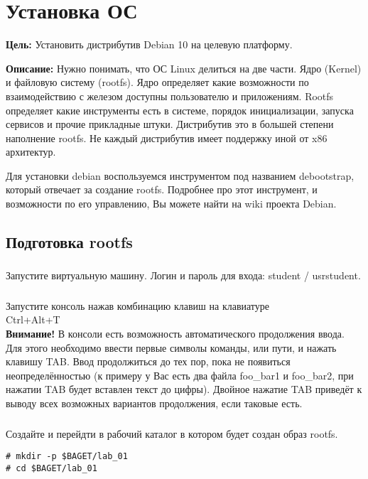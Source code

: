 \chapter{Установка ОС}
\textbf{Цель:} Установить дистрибутив Debian 10 на целевую платформу.

\textbf{Описание:} Нужно понимать, что ОС Linux делиться на две части. Ядро (Kernel) и файловую систему (rootfs). Ядро определяет какие возможности по взаимодействию с железом доступны пользователю и приложениям. Rootfs определяет какие инструменты есть в системе, порядок инициализации, запуска сервисов и прочие прикладные штуки. Дистрибутив это в большей степени наполнение rootfs. Не каждый дистрибутив имеет поддержку иной от x86 архитектур.

Для установки debian воспользуемся инструментом под названием debootstrap, который отвечает за создание rootfs. Подробнее про этот инструмент, и возможности по его управлению, Вы можете найти на wiki проекта Debian.


\section{Подготовка rootfs}

\subsection{}Запустите виртуальную машину. Логин и пароль для входа: student / usrstudent.

\subsection{} Запустите консоль нажав комбинацию клавиш на клавиатуре \\Ctrl+Alt+T\\

\textbf{Внимание!} В консоли есть возможность автоматического продолжения ввода. Для этого необходимо ввести первые символы команды, или пути, и нажать клавишу TAB. Ввод продолжиться до тех пор, пока не появиться неопределённостью (к примеру у Вас есть два файла foo\_bar1 и foo\_bar2, при нажатии TAB будет вставлен текст до цифры). Двойное нажатие TAB приведёт к выводу всех возможных вариантов продолжения, если таковые есть.

\subsection{}Создайте и перейдти в рабочий каталог в котором будет создан образ rootfs.
\begin{lstlisting}[style=bash]
# mkdir -p $BAGET/lab_01
# cd $BAGET/lab_01 
\end{lstlisting}

